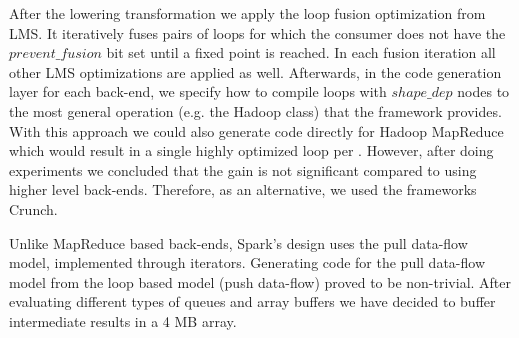 After the lowering transformation we apply the loop fusion optimization from
LMS. It iteratively fuses pairs of loops for which the consumer does not have
the $prevent\_fusion$ bit set until a fixed point is reached. In each fusion
iteration all other LMS optimizations are applied as well. Afterwards, in the
code generation layer for each back-end, we specify how to compile loops with
$shape\_dep$ nodes to the most general operation (e.g. the Hadoop 
class) that the framework provides. With this approach we could also generate
code directly for Hadoop MapReduce which would result in a single highly
optimized loop per . However, after doing experiments we concluded
that the gain is not significant compared to using higher level back-ends.
Therefore, as an alternative, we used the frameworks Crunch.


Unlike MapReduce based back-ends, Spark's design uses the pull data-flow model,
implemented through iterators. Generating code for the pull data-flow model from
the loop based model (push data-flow) proved to be non-trivial. After evaluating
different types of queues and array buffers we have decided to buffer
intermediate results in a 4 MB array.